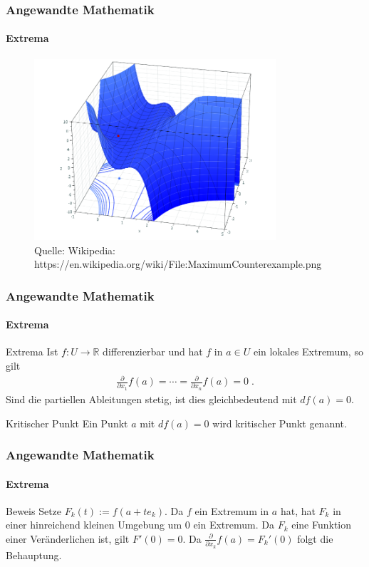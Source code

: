\documentclass{beamer}
\begin{document}
\begin{frame}
    \frametitle{Angewandte Mathematik}
\framesubtitle{Extrema}

\begin{figure}[H]
      \centering
    \includegraphics[width=0.8\textwidth]{images/MaximumCounterexample}
      \caption{Quelle: Wikipedia: https://en.wikipedia.org/wiki/File:MaximumCounterexample.png}
\end{figure}
 \end{frame}



\begin{frame}
    \frametitle{Angewandte Mathematik}
\framesubtitle{Extrema}
    \begin{block}{Extrema}
 Ist $f: U  \to \mathbb{R}$ differenzierbar und hat  $f$ in $a \in U$ ein lokales Extremum, so gilt 
\begin{align*}
\frac{\partial}{\partial x_{1}} f(a) = \cdots  = \frac{\partial}{\partial x_{n}} f(a) = 0 \;.
\end{align*}
Sind die partiellen Ableitungen stetig, ist dies  gleichbedeutend mit $df(a) = 0$.
\end{block}
    \begin{block}{Kritischer Punkt}
 Ein Punkt $a$ mit $df(a) = 0$ wird kritischer Punkt genannt.
\end{block}

 \end{frame}

\begin{frame}
    \frametitle{Angewandte Mathematik}
\framesubtitle{Extrema}
    \begin{block}{Beweis}
Setze $F_k(t) := f(a + t e_k)$. Da $f$ ein Extremum in $a$ hat, hat $F_k$ in einer hinreichend kleinen Umgebung um $0$ ein Extremum. 
Da $F_k$ eine Funktion einer Veränderlichen ist, gilt $F'(0) = 0$. Da $\frac{\partial}{\partial x_k} f(a) = F_k'(0)$ folgt die Behauptung.
\end{block}
 \end{frame}
\end{document}
